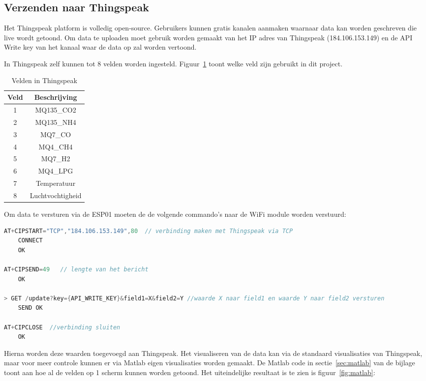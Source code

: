 \subsection{Verzenden naar Thingspeak}
\label{subsec:thingspeak}

Het Thingspeak platform is volledig open-source. Gebruikers kunnen gratis kanalen aanmaken waarnaar data kan worden geschreven die live wordt getoond. Om data te uploaden moet gebruik worden gemaakt van het IP adres van Thingspeak (184.106.153.149) en de API Write key van het kanaal waar de data op zal worden vertoond.

In Thingspeak zelf kunnen tot 8 velden worden ingesteld. Figuur~\ref{tab:velden} toont welke veld zijn gebruikt in dit project.
\begin{table}[h]
    \centering
    \begin{tabular}{|c|c|}
        \hline
        Veld & Beschrijving \\
        \hline
        1 & MQ135\_CO2 \\
        2 & MQ135\_NH4 \\
        3 & MQ7\_CO \\
        4 & MQ4\_CH4 \\
        5 & MQ7\_H2 \\
        6 & MQ4\_LPG \\
        7 & Temperatuur \\
        8 & Luchtvochtigheid \\
        \hline
    \end{tabular}
    \caption{Velden in Thingspeak}
    \label{tab:velden}
\end{table}

Om data te versturen via de ESP01 moeten de de volgende commando's naar de WiFi module worden verstuurd:
\begin{lstlisting}[language=Java,caption={ESP01 naar Thingspeak}]
AT+CIPSTART="TCP","184.106.153.149",80  // verbinding maken met Thingspeak via TCP
    CONNECT
    OK

AT+CIPSEND=49   // lengte van het bericht
    OK

> GET /update?key={API_WRITE_KEY}&field1=X&field2=Y //waarde X naar field1 en waarde Y naar field2 versturen
    SEND OK

AT+CIPCLOSE  //verbinding sluiten
    OK
\end{lstlisting}

Hierna worden deze waarden toegevoegd aan Thingspeak. Het visualiseren van de data kan via de standaard visualisaties van Thingspeak, maar voor meer controle kunnen er via Matlab \autocite{MATLAB} eigen visualisaties worden gemaakt. De Matlab code in sectie~\ref{sec:matlab} van de bijlage toont aan hoe al de velden op 1 scherm kunnen worden getoond.
Het uiteindelijke resultaat is te zien is figuur~\ref{fig:matlab}:

